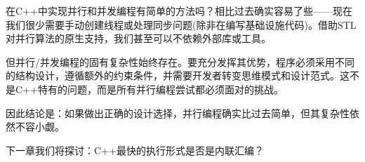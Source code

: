 在C++中实现并行和并发编程有简单的方法吗？相比过去确实容易了些——现在我们很少需要手动创建线程或处理同步问题(除非在编写基础设施代码)。借助STL对并行算法的原生支持，我们甚至可以不依赖外部库或工具。

但并行/并发编程的固有复杂性始终存在。要充分发挥其优势，程序必须采用不同的结构设计，遵循额外的约束条件，并需要开发者转变思维模式和设计范式。这不是C++特有的问题，而是所有并行编程尝试都必须面对的挑战。

因此结论是：如果做出正确的设计选择，并行编程确实比过去简单，但其复杂性依然不容小觑。

下一章我们将探讨：C++最快的执行形式是否是内联汇编？